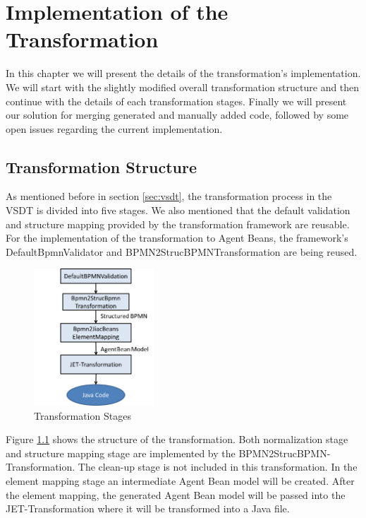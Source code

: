 \chapter{Implementation of the Transformation}
\label{chap:implementation}
In this chapter we will present the details of the transformation's implementation. We will start with the slightly modified overall transformation structure and then continue with the details of each transformation stages. Finally we will present our solution for merging generated and manually added code, followed by some open issues regarding the current implementation.

\section{Transformation Structure}
As mentioned before in section \ref{sec:vsdt}, the transformation process in the VSDT is divided into five stages. We also mentioned that the default validation and structure mapping provided by the transformation framework are reusable. For the implementation of the transformation to Agent Beans, the framework's DefaultBpmnValidator and BPMN2StrucBPMNTransformation are being reused.

\begin{figure}[h]
	\centering	\includegraphics[width=0.4\textwidth]{images/implementation_stages.png}
	\caption{Transformation Stages}
	\label{fig:implementation_stages}
\end{figure}

Figure \ref{fig:implementation_stages} shows the structure of the transformation. Both normalization stage and structure mapping stage are implemented by the BPMN2StrucBPMN-Transformation. The clean-up stage is not included in this transformation. In the element mapping stage an intermediate Agent Bean model will be created. After the element mapping, the generated Agent Bean model will be passed into the JET-Transformation where it will be transformed into a Java file.

